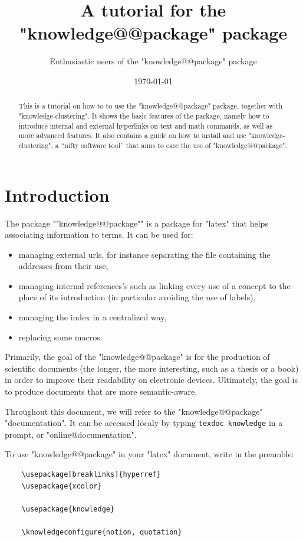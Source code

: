 \documentclass{article}
\title{A tutorial for the "knowledge@@package" package}
\author{Enthusiastic users of the "knowledge@@package" package}
\date{\today}
\begin{document}
\maketitle

\begin{abstract}
    This is a tutorial on how to to use the 
    "knowledge@@package" package, together with "knowledge-clustering".
    It shows the basic features of the package, namely how 
    to introduce internal and external hyperlinks on text and math commands,
    as well as more advanced features.
    It also contains a guide on how to install and use "knowledge-clustering", 
    a ``nifty software tool'' that aims to ease the use of "knowledge@@package".
\end{abstract}

\tableofcontents

\section{Introduction}

The package \AP""knowledge@@package"" is a package for "latex" that helps associating 
information to terms. It can be used for:
\begin{itemize}
    \item managing external urls, for instance separating the file containing   
        the addresses from their use,
    \item managing internal references's such as linking every use of a concept 
        to the place of its introduction
        (in particular avoiding the use of labels),
    \item managing the index in a centralized way,
    \item replacing some macros.
\end{itemize}

Primarily, the goal of the "knowledge@@package" is for the production of scientific documents (the longer, the more interesting, such as a thesis or a book) in order to improve their readability on electronic devices. Ultimately, the goal is to produce documents that are more semantic-aware.

Throughout this document, we will refer to the "knowledge@@package" 
"documentation". It can be accessed localy by typing \verb|texdoc knowledge| in 
a prompt, or "online@documentation".

To use "knowledge@@package" in your "latex" document, write in the preamble:
\begin{verbatim}
    \usepackage[breaklinks]{hyperref} 
    \usepackage{xcolor} 

    \usepackage{knowledge}

    \knowledgeconfigure{notion, quotation}
\end{verbatim}
\end{document}
